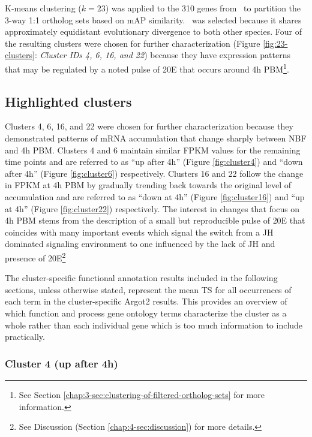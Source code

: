 K-means clustering ($k=23$) was applied to the 310 genes from \Ag\ to partition the 3-way 1:1 ortholog sets based on \gls{mAP} similarity.
%
\Ag\ was selected because it shares approximately equidistant evolutionary divergence to both other species.
%
Four of the resulting clusters were chosen for further characterization (Figure \ref{fig:23-clusters}: \textit{Cluster IDs 4, 6, 16, and 22}) because they have expression patterns that may be regulated by a noted pulse of \gls{20E} that occurs around 4h \gls{PBM}\footnote{See Section \ref{chap:3-sec:clustering-of-filtered-ortholog-sets} for more information.}.
%


\subsection{Highlighted clusters}

Clusters 4, 6, 16, and 22 were chosen for further characterization because they demonstrated patterns of mRNA accumulation that change sharply between \gls{NBF} and 4h \gls{PBM}.
%
Clusters 4 and 6 maintain similar \gls{FPKM} values for the remaining time points and are referred to as ``up after 4h'' (Figure \ref{fig:cluster4}) and ``down after 4h'' (Figure \ref{fig:cluster6}) respectively.
%
Clusters 16 and 22 follow the change in \gls{FPKM} at 4h \gls{PBM} by gradually trending back towards the original level of accumulation and are referred to as ``down at 4h'' (Figure \ref{fig:cluster16}) and ``up at 4h'' (Figure \ref{fig:cluster22}) respectively.
%
The interest in changes that focus on 4h \gls{PBM} stems from the description of a small but reproducible pulse of \gls{20E} that coincides with many important events which signal the switch from a \gls{JH} dominated signaling environment to one influenced by the lack of \gls{JH} and presence of \gls{20E}\footnote{See Discussion (Section \ref{chap:4-sec:discussion}) for more details.}

The cluster-specific functional annotation results included in the following sections, unless otherwise stated, represent the mean \gls{TS} for all occurrences of each term in the cluster-specific \gls{Argot2} results.
%
This provides an overview of which function and process gene ontology terms characterize the cluster as a whole rather than each individual gene which is too much information to include practically.

\subsubsection{Cluster 4 (up after 4h)}

